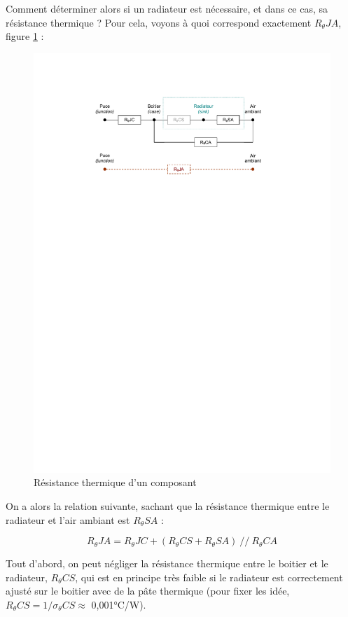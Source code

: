 \documentclass[a4paper]{article}
\begin{document}
Comment déterminer alors si un radiateur est nécessaire, et dans ce cas, sa résistance thermique ? Pour cela, voyons à quoi correspond exactement $R_{\theta}JA$, figure \ref{Resistance_thermique_composant} :

\begin{figure}[H]
	\centering
	\includegraphics[scale=1.00]{Images/Resistance_thermique_composant}
	\caption{Résistance thermique d'un composant
		\label{Resistance_thermique_composant}}
\end{figure}

On a alors la relation suivante, sachant que la résistance thermique entre le radiateur et l'air ambiant est $R_{\theta}SA$ :

\[R_{\theta}JA = R_{\theta}JC + (R_{\theta}CS + R_{\theta}SA)\ //\ R_{\theta}CA\]

Tout d'abord, on peut négliger la résistance thermique entre le boitier et le radiateur, $R_{\theta}CS$, qui est en principe très faible si le radiateur est correctement ajusté sur le boitier avec de la pâte thermique (pour fixer les idée, $R_{\theta}CS = 1/\sigma{}_{\theta}CS \approx$ 0,001°C/W).
\end{document}

